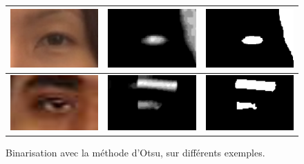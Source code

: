 \begin{figure}[H]
\begin{tabular}{|c|c|c|}
    \includegraphics[width=4cm]{image/017/rgb_source.png} & \includegraphics[width=4cm]{image/017/ycbcr_inv_open.png} & \includegraphics[width=4cm]{image/017/ycbcr_bin_open.png} \\
    \hline
    \includegraphics[width=4cm]{image/ssm3/rgb_source.png} & \includegraphics[width=4cm]{image/ssm3/ycbcr_inv_open.png} & \includegraphics[width=4cm]{image/ssm3/ycbcr_bin_open.png} \\
    \hline
  \end{tabular}
  \caption{Binarisation avec la méthode d'Otsu, sur différents exemples.}
\end{figure}


